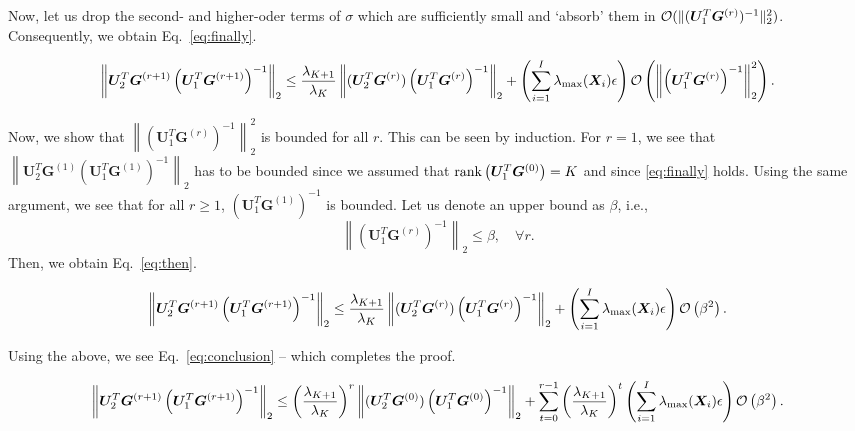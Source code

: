 \documentclass[10pt,journal]{IEEEtran}
\newcommand{\G}{\boldsymbol{G}}
\newcommand{\X}{\boldsymbol{X}}
\newcommand{\U}{\boldsymbol{U}}
\begin{document}
Now, let us drop the second- and higher-oder terms of $\sigma$ which are sufficiently small and `absorb' them in ${\cal O}(\|(\U_1^T\G^{(r)})^{-1}\|_2^2)$. Consequently, we obtain Eq.~\eqref{eq:finally}.
\begin{figure}[t]
\begin{align}\label{eq:finally}
\left\| \U_2^T\G^{(r+1)}\left( \U_1^T\G^{(r+1)} \right)^{-1}  \right\|_2 
\leq \frac{\lambda_{K+1}}{\lambda_K}\left\|( \U_2^T\G^{(r)} )\left( \U_1^T\G^{(r)}\right)^{-1} \right\|_2 +\left(\sum_{i=1}^I\lambda_{\max}(\X_i)\epsilon\right) {\cal O}\left( \left\|\left(\U_1^T\G^{(r)}\right)^{-1}\right\|_2^2\right).
\end{align}
\hrulefill
\end{figure}
Now, we show that $\left\|\left(\U_1^T\G^{(r)}\right)^{-1}\right\|_2^2$ is bounded for all $r$.
This can be seen by induction.
For $r=1$, we see that $\left\| \U_2^T\G^{(1)}\left( \U_1^T\G^{(1)} \right)^{-1}  \right\|_2$
has to be bounded since we assumed that ${\rm rank}\left(\U_1^T\G^{(0)}\right) = K$ and since
\eqref{eq:finally} holds.
Using the same argument, we see that for all $r\geq 1$, $\left( \U_1^T\G^{(1)} \right)^{-1}$ is bounded.
Let us denote an upper bound as $\beta$, i.e.,
\[\left\|\left( \U_1^T\G^{(r)} \right)^{-1}\right\|_2\leq \beta,\quad \forall r.\]
Then, we obtain Eq.~\eqref{eq:then}.
\begin{figure}[t!]
\begin{align}\label{eq:then}
\left\| \U_2^T\G^{(r+1)}\left( \U_1^T\G^{(r+1)} \right)^{-1}  \right\|_2
\leq \frac{\lambda_{K+1}}{\lambda_K}\left\|( \U_2^T\G^{(r)} )\left( \U_1^T\G^{(r)}\right)^{-1} \right\|_2 +\left(\sum_{i=1}^I\lambda_{\max}(\X_i)\epsilon\right) {\cal O}\left( \beta^2\right).
\end{align}
\hrulefill
\end{figure}
Using the above, we see Eq.~\eqref{eq:conclusion}  -- which completes the proof.
\begin{figure}[t!]
\begin{align}\label{eq:conclusion}
\left\| \U_2^T\G^{(r+1)}\left( \U_1^T\G^{(r+1)} \right)^{-1}  \right\|_2
\leq \left(\frac{\lambda_{K+1}}{\lambda_K}\right)^r \left\|( \U_2^T\G^{(0)} )\left( \U_1^T\G^{(0)}\right)^{-1} \right\|_2 +\sum_{t=0}^{r-1} \left(\frac{\lambda_{K+1}}{\lambda_K}\right)^t \left(\sum_{i=1}^I\lambda_{\max}(\X_i)\epsilon\right) {\cal O}\left( \beta^2\right).
\end{align}
\hrulefill
\end{figure}







%


\end{document}
